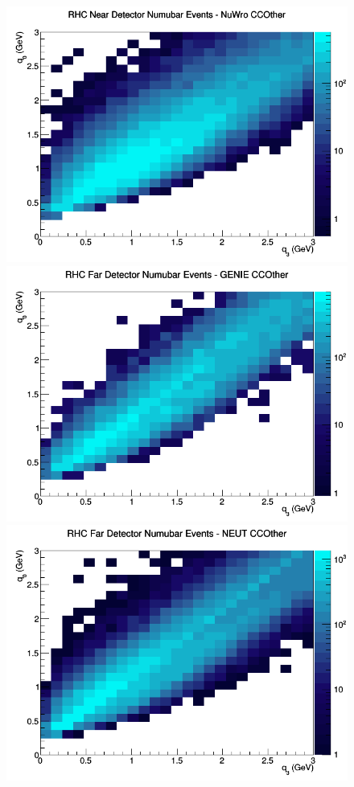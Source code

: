\begin{figure}[h]
\includegraphics[width=\linewidth]{eff_q0_q3/FGT/CCOther_RHC_ND_numubar_q3_q0_NuWro.png}
\endminipage
\newline
{}
\includegraphics[width=\linewidth]{eff_q0_q3/FGT/CCOther_RHC_FD_numubar_q3_q0_GENIE.png}
\endminipage
{}
\includegraphics[width=\linewidth]{eff_q0_q3/FGT/CCOther_RHC_FD_numubar_q3_q0_NEUT.png}

\end{figure}
